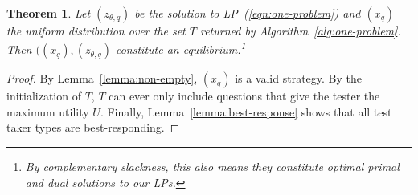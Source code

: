 \documentclass{article}
\newtheorem{theorem}{Theorem}
\begin{document}

\begin{theorem}
Let $(z_{\theta,q})$ be the solution to LP~(\ref{eqn:one-problem}) and
$(x_q)$ the uniform distribution over the set 
 $T$ returned by Algorithm~\ref{alg:one-problem}.  Then
 $((x_q),(z_{\theta,q})$ constitute an equilibrium.\footnote{By
   complementary slackness, this also means they constitute optimal primal
   and dual solutions to our LPs.}
\end{theorem}
\begin{proof}
By Lemma~\ref{lemma:non-empty}, $(x_q)$ is a valid strategy. 
By the initialization of $T$, $T$ can ever only include questions
that give the tester the maximum utility $U$.
Finally, Lemma~\ref{lemma:best-response} shows that all test taker types
are best-responding.
\end{proof}
\end{document}
